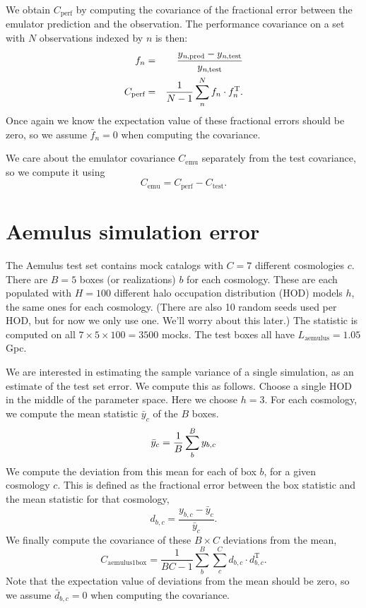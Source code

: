 \documentclass[12pt]{article}
\newcommand{\T}{^{\mathrm{T}}}
\newcommand{\cov}[1]{C_\text{#1}}
\newcommand{\y}[1]{y_{\text{#1}}}
\begin{document}
We obtain $\cov{perf}$ by computing the covariance of the fractional error between the emulator prediction and the observation.
The performance covariance on a set with $N$ observations indexed by $n$ is then:
\begin{eqnarray}
    f_n &=& \frac{ \y{\textit{n},pred} - \y{\textit{n},test} }{ \y{\textit{n},test} } \\
    \cov{perf} &=& \frac{1}{N-1} \sum_n^N f_n \cdot f_n\T.
\end{eqnarray}
Once again we know the expectation value of these fractional errors should be zero, so we assume $\bar{f}_{n}=0$ when computing the covariance.

We care about the emulator covariance $\cov{emu}$ separately from the test covariance, so we compute it using
\label{eq:emu}
\begin{equation}
    \cov{emu} = \cov{perf} - \cov{test}.
\end{equation}


\section{Aemulus simulation error}

The Aemulus test set contains mock catalogs with $C=7$ different cosmologies $c$. 
There are $B=5$ boxes (or realizations) $b$ for each cosmology. 
These are each populated with $H=100$ different halo occupation distribution (HOD) models $h$, the same ones for each cosmology. 
(There are also 10 random seeds used per HOD, but for now we only use one. We'll worry about this later.)
The statistic is computed on all $7 \times 5 \times 100 = 3500$ mocks. 
The test boxes all have $L_\text{aemulus}=1.05$ Gpc.

We are interested in estimating the sample variance of a single simulation, as an estimate of the test set error.
We compute this as follows. 
Choose a single HOD in the middle of the parameter space.
Here we choose $h=3$.
For each cosmology, we compute the mean statistic $\bar{y}_{c}$ of the $B$ boxes.
\begin{equation}
    \bar{y}_{c} = \frac{1}{B} \sum_b^B {y_{b,c}} \\
\end{equation}
We compute the deviation from this mean for each of box $b$, for a given cosmology $c$. 
This is defined as the fractional error between the box statistic and the mean statistic for that cosmology,
\begin{equation}
    d_{b,c} = \frac{ {y_{b,c} - \bar{y}_{c}} } {\bar{y}_{c}}.
\end{equation}
We finally compute the covariance of these $B \times C$ deviations from the mean,
\begin{equation}
    \cov{aemulus1box} = \frac{1}{BC-1} \sum_{b}^B \sum_{c}^C d_{b,c} \cdot d_{b,c}\T.
\end{equation}
Note that the expectation value of deviations from the mean should be zero, so we assume $\bar{d}_{b,c}=0$ when computing the covariance.
\end{document}
